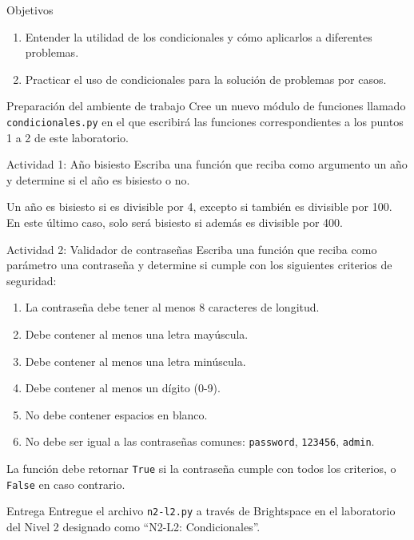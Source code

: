 \documentclass{ip-lab}
\begin{document}
\maketitle

\begin{sectionbox}{Objetivos}
\begin{enumerate}
    \item Entender la utilidad de los condicionales y cómo aplicarlos a diferentes problemas.
    \item Practicar el uso de condicionales para la solución de problemas por casos.
\end{enumerate}
\end{sectionbox}


\begin{sectionbox}{Preparación del ambiente de trabajo}
  Cree un nuevo módulo de funciones llamado \texttt{condicionales.py} en el que escribirá las funciones correspondientes a los puntos 1 a 2 de este laboratorio.
\end{sectionbox}


\begin{sectionbox}{Actividad 1: Año bisiesto}
  Escriba una función que reciba como argumento un año y determine si el año es bisiesto o no.

  Un año es bisiesto si es divisible por 4, excepto si también es divisible por 100. En este último caso, solo será bisiesto si además es divisible por 400.
\end{sectionbox}

\begin{sectionbox}{Actividad 2: Validador de contraseñas}
Escriba una función que reciba como parámetro una contraseña y determine si cumple con los siguientes criterios de seguridad:

\begin{enumerate}
    \item La contraseña debe tener al menos 8 caracteres de longitud.
    \item Debe contener al menos una letra mayúscula.
    \item Debe contener al menos una letra minúscula.
    \item Debe contener al menos un dígito (0-9).

\pagebreak

    \item No debe contener espacios en blanco.
    \item No debe ser igual a las contraseñas comunes: \texttt{password}, \texttt{123456}, \texttt{admin}.
\end{enumerate}

La función debe retornar \texttt{True} si la contraseña cumple con todos los criterios, o \texttt{False} en caso contrario.
\end{sectionbox}

\begin{sectionbox}{Entrega}
Entregue el archivo \texttt{n2-l2.py} a través de Brightspace en el laboratorio del Nivel 2 designado como ``N2-L2: Condicionales''.
\end{sectionbox}
\end{document}
